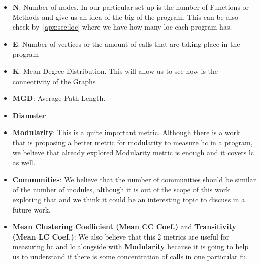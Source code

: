 \documentclass[12pt, a4paper]{article}
\begin{document}
\begin{itemize}
    \item \textbf{N}: Number of nodes. In our particular set up is the number of Functions or Methods and give us an idea of the big of the program.
    This can be also check by~\ref{apx:sec:loc} where we have how many \acrlong{loc} each program has.
    \item \textbf{E}: Number of vertices or the amount of calls that are taking place in the program
    \item \textbf{K}: Mean Degree Distribution. This will allow us to see how is the connectivity of the Graphs
    \item \textbf{MGD}: Average Path Length. 
    \item \textbf{Diameter}
    \item \textbf{Modularity}: This is a quite important metric. Although there is a work~\cite{paper_cohesion} that is proposing a better metric for modularity
     to measure \acrlong{hc} in a program, we believe that already explored Modularity metric is enough and it covers \acrlong{lc} as well.
    \item \textbf{Communities}: We believe that the number of communities should be similar of the number of modules, although it is out of the scope of this work exploring that
    and we think it could be an interesting topic to discuss in a future work.
    \item \textbf{Mean Clustering Coefficient (Mean CC Coef.)} and \textbf{Transitivity (Mean LC Coef.)}: We also believe that this 2 metrics are useful for measuring \acrlong{hc} and \acrlong{lc}
    alongside with \textbf{Modularity} because it is going to help us to understand if there is some concentration of calls in one particular \acrlong{fu}.
\end{itemize}
\end{document}
